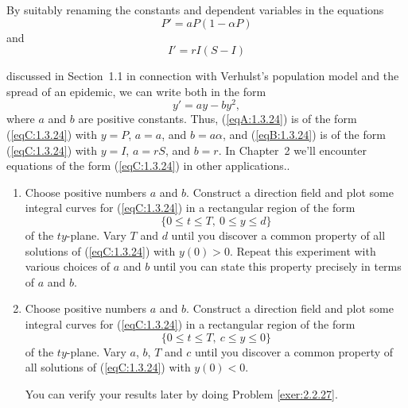 \documentclass{ximera}
\begin{document}
\begin{problem}\label{exer:1.3.24}
By suitably renaming the constants and  dependent variables
in the equations
\begin{equation}\label{eqA:1.3.24}
P'=aP(1-\alpha P)
\end{equation}
and
\begin{equation}\label{eqB:1.3.24}
I'=rI(S-I)
\end{equation}

discussed in Section~1.1 in connection with Verhulst's
population
model and the spread of an epidemic, we can write both in the form
\begin{equation}\label{eqC:1.3.24}
y'=ay-by^2,
\end{equation}
where $a$ and $b$ are positive constants. Thus, (\ref{eqA:1.3.24}) is of the form (\ref{eqC:1.3.24})
with $y=P$, $a=a$, and $b=a\alpha$, and (\ref{eqB:1.3.24}) is of the form (\ref{eqC:1.3.24}) with
$y=I$, $a=rS$, and $b=r$. In Chapter~2 we'll encounter
equations of the form
(\ref{eqC:1.3.24}) in
 other applications..

\begin{enumerate}
\item %
Choose positive numbers $a$ and $b$. Construct a direction field and
plot some integral curves for (\ref{eqC:1.3.24}) in a rectangular region of the form
$$
\{0\leq t\leq T,\ 0\leq y\leq d\}
$$
of the $ty$-plane. Vary $T$ and $d$ until you discover a common
property of all solutions of (\ref{eqC:1.3.24}) with $y(0)>0$. Repeat this experiment
with various choices of $a$ and $b$ until you can state this property
precisely in terms of $a$ and $b$.

\item %
Choose  positive numbers $a$ and $b$. Construct a direction field and
plot some integral curves for (\ref{eqC:1.3.24}) in a rectangular region of the form
$$
\{0\leq t\leq T,\ c\leq y\leq 0\}
$$
of the $ty$-plane. Vary $a$, $b$, $T$ and $c$ until you discover a
common property of all solutions of (\ref{eqC:1.3.24}) with $y(0)<0$.

You can verify your results later by doing Problem \ref{exer:2.2.27}.

\end{enumerate}
\end{problem}
\end{document}
